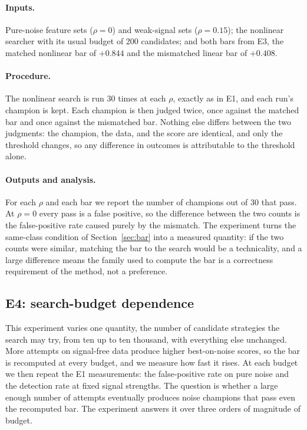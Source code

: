 \documentclass[11pt]{article}
\begin{document}
\paragraph{Inputs.} Pure-noise feature sets ($\rho=0$) and weak-signal sets ($\rho=0.15$); the nonlinear
searcher with its usual budget of 200 candidates; and both bars from E3, the matched nonlinear bar of
$+0.844$ and the mismatched linear bar of $+0.408$.

\paragraph{Procedure.} The nonlinear search is run 30 times at each $\rho$, exactly as in E1, and each
run's champion is kept. Each champion is then judged twice, once against the matched bar and once against
the mismatched bar. Nothing else differs between the two judgments: the champion, the data, and the score
are identical, and only the threshold changes, so any difference in outcomes is attributable to the
threshold alone.

\paragraph{Outputs and analysis.} For each $\rho$ and each bar we report the number of champions out of
30 that pass. At $\rho=0$ every pass is a false positive, so the difference between the two counts is the
false-positive rate caused purely by the mismatch. The experiment turns the same-class condition of
Section~\ref{sec:bar} into a measured quantity: if the two counts were similar, matching the bar to the
search would be a technicality, and a large difference means the family used to compute the bar is a
correctness requirement of the method, not a preference.

\subsection{E4: search-budget dependence}

This experiment varies one quantity, the number of candidate
strategies the search may try, from ten up to ten thousand, with everything else unchanged. More attempts
on signal-free data produce higher best-on-noise scores, so the bar is recomputed at every budget, and we
measure how fast it rises. At each budget we then repeat the E1 measurements: the false-positive rate on
pure noise and the detection rate at fixed signal strengths. The question is whether a large enough
number of attempts eventually produces noise champions that pass even the recomputed bar. The experiment
answers it over three orders of magnitude of budget.
\end{document}
